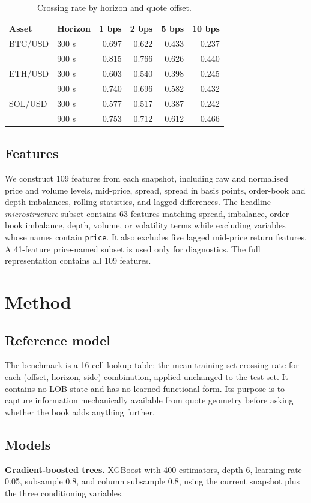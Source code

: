 \documentclass[11pt]{article}
\begin{document}
\begin{table}[ht]
\centering
\caption{Crossing rate by horizon and quote offset.}
\begin{tabular}{llrrrr}
\toprule
Asset & Horizon & 1 bps & 2 bps & 5 bps & 10 bps \\
\midrule
BTC/USD & 300 s & 0.697 & 0.622 & 0.433 & 0.237 \\
& 900 s & 0.815 & 0.766 & 0.626 & 0.440 \\
ETH/USD & 300 s & 0.603 & 0.540 & 0.398 & 0.245 \\
& 900 s & 0.740 & 0.696 & 0.582 & 0.432 \\
SOL/USD & 300 s & 0.577 & 0.517 & 0.387 & 0.242 \\
& 900 s & 0.753 & 0.712 & 0.612 & 0.466 \\
\bottomrule
\end{tabular}
\end{table}

\subsection{Features}
We construct 109 features from each snapshot, including raw and normalised price and volume levels, mid-price, spread, spread in basis points, order-book and depth imbalances, rolling statistics, and lagged differences. The headline \emph{microstructure} subset contains 63 features matching spread, imbalance, order-book imbalance, depth, volume, or volatility terms while excluding variables whose names contain \texttt{price}. It also excludes five lagged mid-price return features. A 41-feature price-named subset is used only for diagnostics. The full representation contains all 109 features.

\section{Method}
\subsection{Reference model}
The benchmark is a 16-cell lookup table: the mean training-set crossing rate for each (offset, horizon, side) combination, applied unchanged to the test set. It contains no LOB state and has no learned functional form. Its purpose is to capture information mechanically available from quote geometry before asking whether the book adds anything further.

\subsection{Models}
\textbf{Gradient-boosted trees.} XGBoost with 400 estimators, depth 6, learning rate 0.05, subsample 0.8, and column subsample 0.8, using the current snapshot plus the three conditioning variables.
\end{document}
